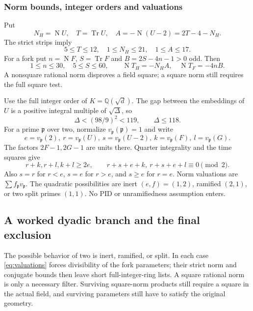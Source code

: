 \documentclass[11pt]{article}
\theoremstyle{remark}\newtheorem{remark}[theorem]{Remark}
\numberwithin{equation}{section}
\newcommand{\Q}{\mathbb Q}
\newcommand{\Tr}{\operatorname{Tr}}
\newcommand{\N}{\operatorname{N}}
\begin{document}
\subsubsection{Norm bounds, integer orders and valuations}

Put
 \[
 N_H=\N U,\quad T=\Tr U,\quad A=-\N(U-2)=2T-4-N_H.
\]
The strict strips imply
 \[
 5\le T\le12,\quad1\le N_H\le21,\quad1\le A\le17.
\]
For a fork put $n=\N F$, $S=\Tr F$ and
 $B=2S-4n-1>0$ odd. Then
 \begin{equation}\label{arith:eq:tnorm}
 1\le n\le30,\quad5\le S\le60,\qquad
 \N T_H=-N_HA,\quad\N T_F=-4nB.
\end{equation}
A nonsquare rational norm disproves a field square; a square norm
still requires the full square test.

Use the full integer order of $K=\Q(\sqrt d)$.
The gap between the embeddings of $U$ is a positive integral
multiple of $\sqrt\Delta$, so
 \begin{equation}\label{arith:eq:disc118}
 \Delta<(98/9)^2<119,\qquad\Delta\le118.
\end{equation}
For a prime $\mathfrak p$ over two, normalize
 $v_{\mathfrak p}(\mathfrak p)=1$ and write
 \[
 e=v_{\mathfrak p}(2),\ r=v_{\mathfrak p}(U),\
 s=v_{\mathfrak p}(U-2),\
 k=v_{\mathfrak p}(F),\ l=v_{\mathfrak p}(G).
\]
The factors $2F-1,2G-1$ are units there. Quarter integrality and
the time squares give
 \begin{equation}\label{eq:valuations}
 r+k,r+l,k+l\ge2e,\qquad
 r+s+e+k,\ r+s+e+l\equiv0\pmod2.
\end{equation}
Also $s=r$ for $r<e$, $s=e$ for $r>e$, and $s\ge e$ for
 $r=e$. Norm valuations are $\sum f_{\mathfrak p}v_{\mathfrak p}$.
The quadratic possibilities are inert $(e,f)=(1,2)$, ramified
 $(2,1)$, or two split primes $(1,1)$. No PID or unramifiedness
assumption enters.


\subsection{A worked dyadic branch and the final exclusion}
\label{arith:sec:odd-inert}
The possible behavior of two is inert, ramified, or split. In each case
\eqref{eq:valuations} forces divisibility of the fork parameters; their
strict norm and conjugate bounds then leave short full-integer-ring
lists. A square rational norm is only a necessary filter. Surviving
square-norm products still require a square in the actual field, and
surviving parameters still have to satisfy the original geometry.
\end{document}
